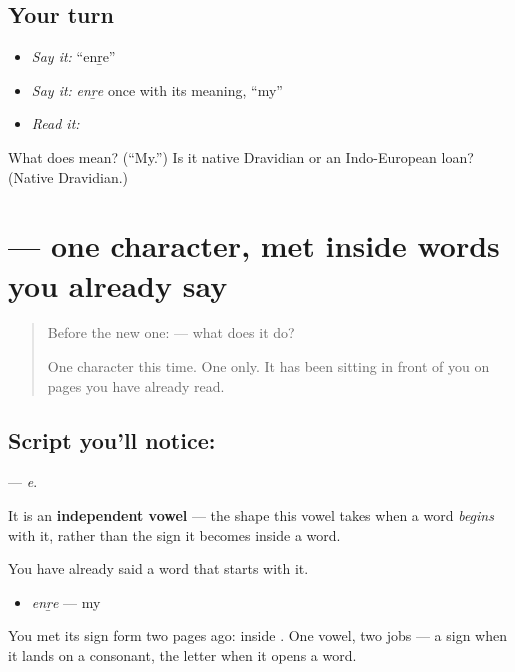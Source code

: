 \subsection*{Your turn}
\begin{itemize}
\raggedright
  \item \emph{Say it:} \textquotedblleft{}enṟe\textquotedblright{}
  \item \emph{Say it:} \emph{enṟe} once with its meaning, \textquotedblleft{}my\textquotedblright{}
  \item \emph{Read it:} \textbf{}
\end{itemize}

\begin{tcolorbox}[breakable,colback=teal!4,colframe=teal!35!black,title={Before you move on}]
What does \textbf{} mean? (\textquotedblleft{}My.\textquotedblright{}) Is it native Dravidian or an Indo-European loan? (Native Dravidian.)
\end{tcolorbox}
\section[\texorpdfstring{\ml{എ} (e)}{എ (e)}]{ — one character, met inside words you already say}

\label{lesson:ML-S135-letter-e}



\begin{quote}
Before the new one:  — what does it do?

One character this time. One only. It has been sitting in front of you on pages you have already read.
\end{quote}

\subsection*{Script you'll notice: }
\textbf{} — \emph{e}.

It is an \textbf{independent vowel} — the shape this vowel takes when a word \emph{begins} with it, rather than the sign it becomes inside a word.

You have already said a word that starts with it.

\begin{itemize}
\raggedright
  \item \textbf{} \emph{enṟe} — my
\end{itemize}

You met its sign form two pages ago: \textbf{} inside \textbf{}. One vowel, two jobs — a sign when it lands on a consonant, the letter \textbf{} when it opens a word.

